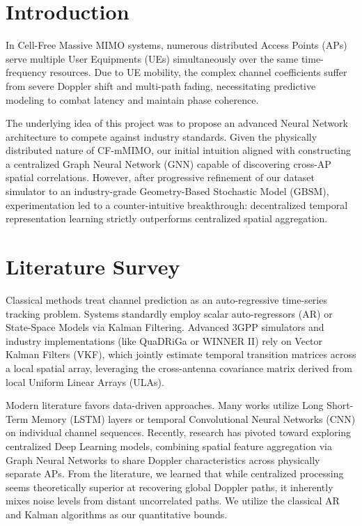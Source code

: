\documentclass[12pt,a4paper]{article}
\begin{document}
\newpage


\section{Introduction}
In Cell-Free Massive MIMO systems, numerous distributed Access Points (APs) serve multiple User Equipments (UEs) simultaneously over the same time-frequency resources. Due to UE mobility, the complex channel coefficients suffer from severe Doppler shift and multi-path fading, necessitating predictive modeling to combat latency and maintain phase coherence.

The underlying idea of this project was to propose an advanced Neural Network architecture to compete against industry standards. Given the physically distributed nature of CF-mMIMO, our initial intuition aligned with constructing a centralized Graph Neural Network (GNN) capable of discovering cross-AP spatial correlations. However, after progressive refinement of our dataset simulator to an industry-grade Geometry-Based Stochastic Model (GBSM), experimentation led to a counter-intuitive breakthrough: decentralized temporal representation learning strictly outperforms centralized spatial aggregation.

\section{Literature Survey}
Classical methods treat channel prediction as an auto-regressive time-series tracking problem. Systems standardly employ scalar auto-regressors (AR) or State-Space Models via Kalman Filtering. 
Advanced 3GPP simulators and industry implementations (like QuaDRiGa or WINNER II) rely on Vector Kalman Filters (VKF), which jointly estimate temporal transition matrices across a local spatial array, leveraging the cross-antenna covariance matrix derived from local Uniform Linear Arrays (ULAs).

Modern literature favors data-driven approaches. Many works utilize Long Short-Term Memory (LSTM) layers or temporal Convolutional Neural Networks (CNN) on individual channel sequences. Recently, research has pivoted toward exploring centralized Deep Learning models, combining spatial feature aggregation via Graph Neural Networks to share Doppler characteristics across physically separate APs.
From the literature, we learned that while centralized processing seems theoretically superior at recovering global Doppler paths, it inherently mixes noise levels from distant uncorrelated paths. We utilize the classical AR and Kalman algorithms as our quantitative bounds.
\end{document}
